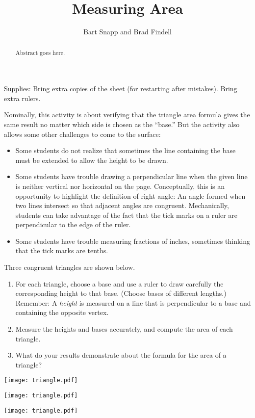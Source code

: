 \documentclass{ximera}
\title{Measuring Area}
\author{Bart Snapp and Brad Findell}
\begin{document}
\begin{abstract}
Abstract goes here.  
\end{abstract}
\maketitle


\begin{teachingnote}
Supplies: Bring extra copies of the sheet (for restarting after mistakes).  Bring extra rulers. 

Nominally, this activity is about verifying that the triangle area formula gives the same result no matter which
side is chosen as the ``base.''  But the activity also allows some other challenges to come to the surface:  
\begin{itemize}
\item Some students do not realize that sometimes the line containing the base must be 
extended to allow the height to be drawn. 
\item Some students have trouble drawing a perpendicular line when the given line is neither vertical nor 
horizontal on the page.  Conceptually, this is an opportunity to highlight the definition of right angle:  An angle formed when two lines intersect so that adjacent angles are congruent.  Mechanically, students can take advantage of the fact that the tick marks on 
a ruler are perpendicular to the edge of the ruler.  
\item Some students have trouble measuring fractions of inches, sometimes thinking that the tick marks are tenths.  
\end{itemize}
\end{teachingnote}


\begin{problem}
Three congruent triangles are shown below.   
\begin{enumerate}
\item For each triangle, choose a base and use a ruler to draw carefully the corresponding height to that base.  (Choose bases of different lengths.)  Remember:  A \emph{height} is measured on a line that is perpendicular to a base and containing the opposite vertex. 
\item Measure the heights and bases accurately, and compute the area of each triangle.  
\item What do your results demonstrate about the formula for the area of a triangle?  
\end{enumerate}

\begin{image}
\texttt{[image: triangle.pdf]}
\end{image}
\begin{image}
\texttt{[image: triangle.pdf]}
\end{image}
\begin{image}
\texttt{[image: triangle.pdf]}
\end{image}

\end{problem}
\end{document}
